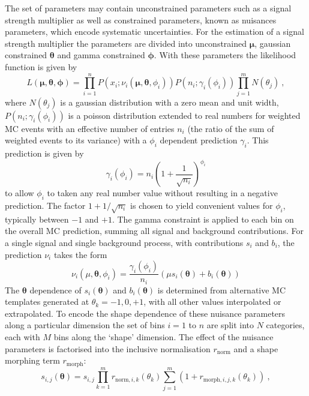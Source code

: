 The set of parameters may contain unconstrained parameters such as a signal strength multiplier as well as constrained parameters, known as nuisances parameters, which encode systematic uncertainties. For the estimation of a signal strength multiplier the parameters are divided into unconstrained $\bm{\mu}$, gaussian constrained $\bm{\theta}$ and gamma constrained $\bm{\phi}$. With these parameters the likelihood function is given by
%
\begin{equation}
    L(\bm{\mu},\bm{\theta},\bm{\phi}) = \prod_{i=1}^{n}P(x_i;\nu_i(\bm{\mu},\bm{\theta},\phi_i))P(n_i;\gamma_i(\phi_i))\prod_{j=1}^{m}N(\theta_j)\ ,
\end{equation}
%
where $N(\theta_j)$ is a gaussian distribution with a zero mean and unit width, $P(n_i;\gamma_i(\phi_i))$ is a poisson distribution extended to real numbers for weighted MC events with an effective number of entries $n_i$ (the ratio of the sum of weighted events to its variance) with a $\phi_i$ dependent prediction $\gamma_i$. This prediction is given by
%
\begin{equation}\label{eq:gammai}
    \gamma_i(\phi_i) = n_i\left(1 + \frac{1}{\sqrt{n_i}}\right)^{\phi_i}
\end{equation}
%
to allow $\phi_i$ to taken any real number value without resulting in a negative prediction. The factor $1 + 1/\sqrt{n_i}$ is chosen to yield convenient values for $\phi_i$, typically between $-1$ and $+1$. The gamma constraint is applied to each bin on the overall MC prediction, summing all signal and background contributions. For a single signal and single background process, with contributions $s_i$ and $b_i$, the prediction $\nu_i$ takes the form
%
\begin{equation}
    \nu_i(\mu,\bm{\theta},\phi_i) = \frac{\gamma_i(\phi_i)}{n_i}\left(\mu s_i(\bm{\theta}) + b_i(\bm{\theta})\right)
\end{equation}
%
The $\bm{\theta}$ dependence of $s_i(\bm{\theta})$ and $b_i(\bm{\theta})$ is determined from alternative MC templates generated at $\theta_k=-1,0,+1$, with all other values interpolated or extrapolated. To encode the shape dependence of these nuisance parameters along a particular dimension the set of bins $i=1$ to $n$ are split into $N$ categories, each with $M$ bins along the `shape' dimension. The effect of the nuisance parameters is factorised into the inclusive normalisation $r_{\mathrm{norm}}$ and a shape morphing term $r_{\mathrm{morph}}$:
\begin{equation}
    s_{i,j}(\bm{\theta}) = s_{i,j}\prod_{k=1}^{m}r_{\mathrm{norm},i,k}(\theta_k)\sum_{j=1}^{m}(1+r_{\mathrm{morph},i,j,k}(\theta_k))\ ,
\end{equation}
